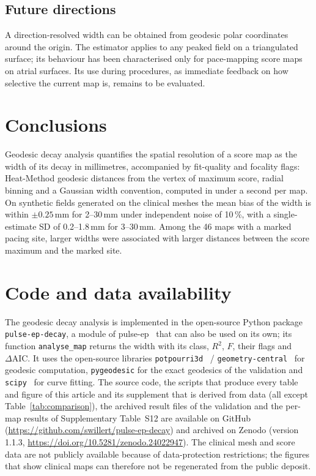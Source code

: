 \documentclass[a4paper,fleqn]{cas-dc}
\begin{document}
\subsection{Future directions}\label{sec:disc_future}
A direction-resolved width can be obtained from geodesic polar
coordinates around the origin.  The estimator
applies to any peaked field on a triangulated surface; its behaviour has
been characterised only for pace-mapping score maps on atrial surfaces.  Its use
during procedures, as immediate feedback on how selective the current
map is, remains to be evaluated.


\section{Conclusions}\label{sec:conclusions}
Geodesic decay analysis quantifies the spatial resolution of a score map
as the width of its decay in millimetres, accompanied by fit-quality and focality flags: Heat-Method
geodesic distances from the vertex of maximum score, radial binning and a
Gaussian width convention, computed in under a second per map.  On
synthetic fields generated on the clinical meshes the mean bias of the
width is within $\pm 0.25$\,mm for 2--30\,mm under independent noise of
10\,\%, with a single-estimate SD of 0.2--1.8\,mm for 3--30\,mm.  Among the 46 maps with a marked pacing site, larger widths were
associated with larger distances between the score maximum and the
marked site.




\section*{Code and data availability}
The geodesic decay analysis is implemented in the open-source Python
package \texttt{pulse-ep-decay}, a module of
pulse-ep~\citep{willert2026pulseep} that can also be used on its own;
its function \texttt{analyse\_map} returns the width with its class,
$R^2$, $F$, their flags and $\Delta\mathrm{AIC}$.
It uses the open-source libraries
\texttt{potpourri3d}~\citep{sharp2021} /
\texttt{geometry-central}~\citep{sharp2019} for geodesic
computation, \texttt{pygeodesic} for the exact geodesics of the
validation and \texttt{scipy}~\citep{virtanen2020} for curve fitting.
The source code, the scripts that produce every table and figure of
this article and its supplement that is derived from data (all except
Table~\ref{tab:comparison}), the archived
result files of the validation and the per-map results of
Supplementary Table~S12 are available on GitHub
(\url{https://github.com/swillert/pulse-ep-decay}) and archived on
Zenodo (version 1.1.3, \url{https://doi.org/10.5281/zenodo.24022947}).  The clinical mesh and score data are
not publicly available because of data-protection restrictions; the
figures that show clinical maps can therefore not be regenerated from
the public deposit.
\end{document}
